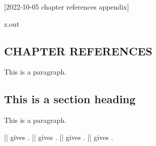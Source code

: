 [2022-10-05 chapter references appendix]

\begin{VerbatimOut}{z.out}
\begin{refsection}
\chapter{CHAPTER REFERENCES}

This is a paragraph.

\section{This is a section heading}

This is a paragraph.

|\cite{reid2013}| gives \cite{reid2013}.
|\cite{test-long-title}| gives \cite{test-long-title}.
|\cite{sexon2012}| gives \cite{sexon2012}.
|\cite{test-long-titleb}| gives \cite{test-long-titleb}.

\PrintChapterBibliography
\end{refsection}
\end{VerbatimOut}

\MyIO
